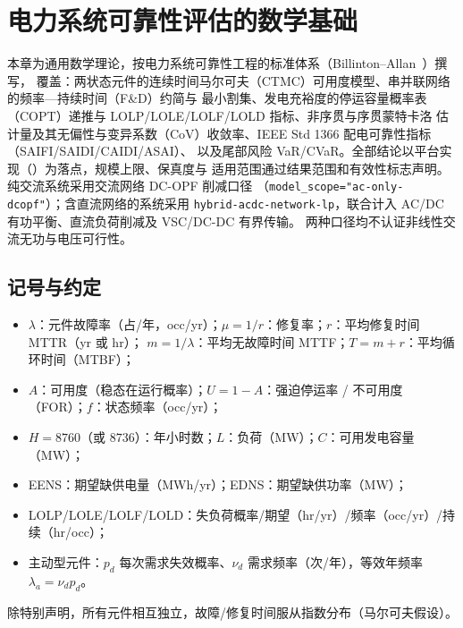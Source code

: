 
\section{电力系统可靠性评估的数学基础}\label{sec:rel-th}

\begin{theorynote}
本章为通用数学理论，按电力系统可靠性工程的标准体系（Billinton--Allan~\cite{rel:billinton-allan}）撰写，
覆盖：两状态元件的连续时间马尔可夫（CTMC）可用度模型、串并联网络的频率—持续时间（F\&D）约简与
最小割集、发电充裕度的停运容量概率表（COPT）递推与 LOLP/LOLE/LOLF/LOLD 指标、非序贯与序贯蒙特卡洛
估计量及其无偏性与变异系数（CoV）收敛率、IEEE Std 1366 配电可靠性指标（SAIFI/SAIDI/CAIDI/ASAI）、
以及尾部风险 VaR/CVaR。全部结论以平台实现（）为落点，规模上限、保真度与
适用范围通过结果范围和有效性标志声明。纯交流系统采用交流网络 DC-OPF 削减口径
（\texttt{model\_scope="ac-only-dcopf"}）；含直流网络的系统采用
\texttt{hybrid-acdc-network-lp}，联合计入 AC/DC 有功平衡、直流负荷削减及 VSC/DC-DC 有界传输。
两种口径均不认证非线性交流无功与电压可行性。
\end{theorynote}

\subsection{记号与约定}\label{sec:rel-th-notation}
\begin{itemize}
  \item $\lambda$：元件故障率（占/年，occ/yr）；$\mu=1/r$：修复率；$r$：平均修复时间 MTTR（yr 或 hr）；
        $m=1/\lambda$：平均无故障时间 MTTF；$T=m+r$：平均循环时间（MTBF）；
  \item $A$：可用度（稳态在运行概率）；$U=1-A$：强迫停运率 / 不可用度（FOR）；$f$：状态频率（occ/yr）；
  \item $H=8760$（或 $8736$）：年小时数；$L$：负荷（MW）；$C$：可用发电容量（MW）；
  \item EENS：期望缺供电量（MWh/yr）；EDNS：期望缺供功率（MW）；
  \item LOLP/LOLE/LOLF/LOLD：失负荷概率/期望（hr/yr）/频率（occ/yr）/持续（hr/occ）；
  \item 主动型元件：$p_d$ 每次需求失效概率、$\nu_d$ 需求频率（次/年），等效年频率 $\lambda_a=\nu_d p_d$。
\end{itemize}
除特别声明，所有元件相互独立，故障/修复时间服从指数分布（马尔可夫假设）。

